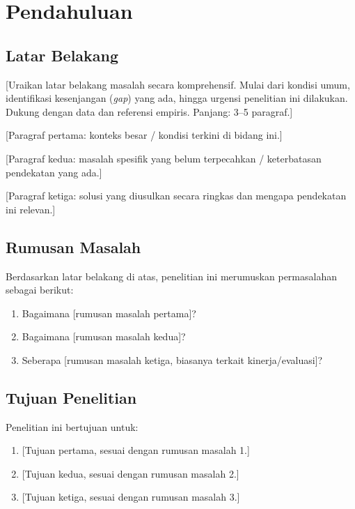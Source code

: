
\chapter{Pendahuluan}

\section{Latar Belakang}
\label{sec:1.1}

[Uraikan latar belakang masalah secara komprehensif. Mulai dari kondisi umum, identifikasi
kesenjangan (\emph{gap}) yang ada, hingga urgensi penelitian ini dilakukan. Dukung dengan
data dan referensi empiris. Panjang: 3--5 paragraf.]

[Paragraf pertama: konteks besar / kondisi terkini di bidang ini.]

[Paragraf kedua: masalah spesifik yang belum terpecahkan / keterbatasan pendekatan yang ada.]

[Paragraf ketiga: solusi yang diusulkan secara ringkas dan mengapa pendekatan ini relevan.]

\section{Rumusan Masalah}
\label{sec:1.2}

Berdasarkan latar belakang di atas, penelitian ini merumuskan permasalahan sebagai berikut:

\begin{enumerate}
  \item Bagaimana [rumusan masalah pertama]?
  \item Bagaimana [rumusan masalah kedua]?
  \item Seberapa [rumusan masalah ketiga, biasanya terkait kinerja/evaluasi]?
\end{enumerate}

\section{Tujuan Penelitian}
\label{sec:1.3}

Penelitian ini bertujuan untuk:

\begin{enumerate}
  \item {[Tujuan pertama, sesuai dengan rumusan masalah 1.]}
  \item {[Tujuan kedua, sesuai dengan rumusan masalah 2.]}
  \item {[Tujuan ketiga, sesuai dengan rumusan masalah 3.]}
\end{enumerate}

